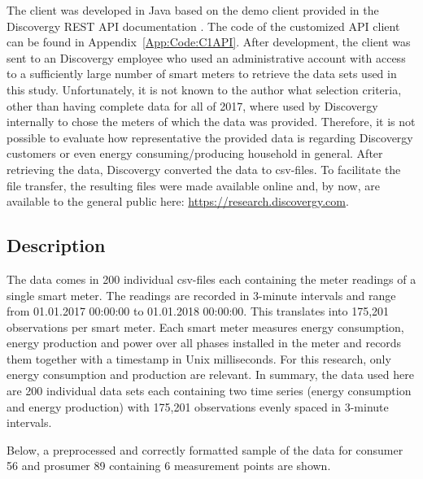 The client was developed in Java based on the demo client provided in the Discovergy REST API documentation \citep{DiscovergyAPI:2018}. The code of the customized API client can be found in Appendix~\ref{App:Code:C1API}. After development, the client was sent to an Discovergy employee who used an administrative account with access to a sufficiently large number of smart meters to retrieve the data sets used in this study. Unfortunately, it is not known to the author what selection criteria, other than having complete data for all of 2017, where used by Discovergy internally to chose the meters of which the data was provided. Therefore, it is not possible to evaluate how representative the provided data is regarding Discovergy customers or even energy consuming/producing household in general.
After retrieving the data, Discovergy converted the data to csv-files. To facilitate the file transfer, the resulting files were made available online and, by now, are available to the general public here: \href{https://research.discovergy.com}{https://research.discovergy.com}. 




\subsection{Description}\label{Sec:Data;Subsec:Description}

The data comes in 200 individual csv-files each containing the meter readings of a single smart meter. The readings are recorded in 3-minute intervals and range from 01.01.2017 00:00:00 to 01.01.2018 00:00:00. This translates into 175,201 observations per smart meter. Each smart meter measures energy consumption, energy production and power over all phases installed in the meter and records them together with a timestamp in Unix milliseconds. For this research, only energy consumption and production are relevant. In summary, the data used here are 200 individual data sets each containing two time series (energy consumption and energy production) with 175,201 observations evenly spaced in 3-minute intervals.

Below, a preprocessed and correctly formatted sample of the data for consumer 56 and prosumer 89 containing 6 measurement points are shown.

